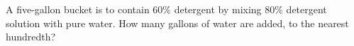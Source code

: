 A five-gallon bucket is to contain $60\%$ detergent by mixing $80\%$ detergent solution with pure water. How many gallons of water are added, to the nearest hundredth?
